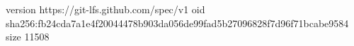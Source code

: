 version https://git-lfs.github.com/spec/v1
oid sha256:fb24cda7a1e4f20044478b903da056de99fad5b27096828f7d96f71bcabe9584
size 11508

